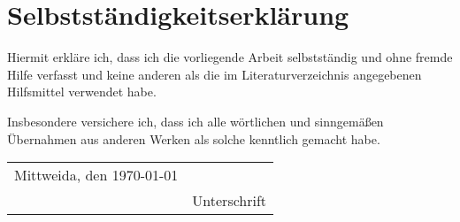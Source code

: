 
\chapter*{Selbstst\"{a}ndigkeitserkl\"{a}rung}
Hiermit erkl\"{a}re ich, dass ich die vorliegende Arbeit selbstständig und ohne fremde Hilfe verfasst und keine anderen als die im Literaturverzeichnis angegebenen Hilfsmittel verwendet habe.

Insbesondere versichere ich, dass ich alle wörtlichen und sinngemäßen Übernahmen aus anderen Werken als solche kenntlich gemacht habe.
\vspace{1cm}

\begin{tabular}{lp{4.8cm}}
Mittweida, den \today & \dotfill                     \\
                          & Unterschrift
\end{tabular}
\thispagestyle{empty}